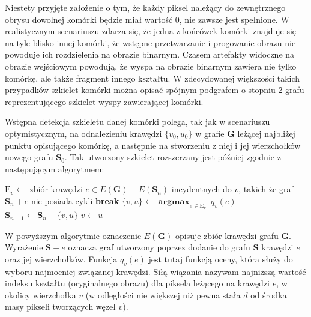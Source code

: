 \documentclass[declaration,shortabstract,mgr]{iithesis}
\DeclareMathOperator*{\argmax}{\textbf{argmax}}
\begin{document}
Niestety przyjęte założenie o tym, że każdy piksel należący do zewnętrznego obrysu dowolnej komórki będzie miał wartość $0$, nie zawsze jest spełnione. W realistycznym scenariuszu zdarza się, że jedna z końcówek komórki znajduje się na tyle blisko innej komórki, że wstępne przetwarzanie i progowanie obrazu nie powoduje ich rozdzielenia na obrazie binarnym. Czasem artefakty widoczne na obrazie wejściowym powodują, że wyspa na obrazie binarnym zawiera nie tylko komórkę, ale także fragment innego kształtu. W zdecydowanej większości takich przypadków szkielet komórki można opisać spójnym podgrafem o stopniu 2 grafu reprezentującego szkielet wyspy zawierającej komórki.

Wstępna detekcja szkieletu danej komórki polega, tak jak w scenariuszu optymistycznym, na odnalezieniu krawędzi $\{v_0, u_0\}$ w grafie $\mathbf{G}$ leżącej najbliżej punktu opisującego komórkę, a następnie na stworzeniu z niej i jej wierzchołków nowego grafu $\mathbf{S}_0$. Tak utworzony szkielet rozszerzany jest później zgodnie z następującym algorytmem:

\par\bigskip
\begin{algorithmic}
  \LOOP
    \STATE
      $\text{E}_v \gets$ zbiór krawędzi $e \in E(\mathbf{G}) - E(\mathbf{S}_n)$ incydentnych do $v$,\newline
       takich że graf $\mathbf{S}_n + e$ nie posiada cykli
      \STATE \textbf{break}
    \ENDIF
    \STATE $\{v, u\} \gets \argmax_{e \in \text{E}_v} \ q_v(e)$
    \STATE $\mathbf{S}_{n+1} \gets \mathbf{S}_n + \{v, u\} $
    \STATE $v \gets u$
  \ENDLOOP
\ENDFOR
\end{algorithmic}
\par\bigskip

\noindent
W powyższym algorytmie oznaczenie $E(\mathbf{G})$ opisuje zbiór krawędzi grafu $\mathbf{G}$.
Wyrażenie $\mathbf{S} + e$ oznacza graf utworzony poprzez dodanie do grafu $\mathbf{S}$ krawędzi $e$ oraz jej wierzchołków.
Funkcja $q_v(e)$ jest tutaj funkcją oceny, która służy do wyboru najmocniej związanej krawędzi. Siłą wiązania nazywam najniższą wartość indeksu kształtu (oryginalnego obrazu) dla piksela leżącego na krawędzi $e$, w okolicy wierzchołka $v$ (w odległości nie większej niż pewna stała $d$ od środka masy pikseli tworzących węzeł $v$).
\end{document}
